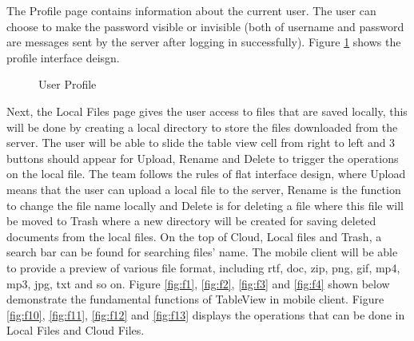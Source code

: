 \documentclass{article}
\begin{document}
The Profile page contains information about the current user. The user can choose to make the password visible or invisible (both of username and password are messages sent by the server after logging in successfully). Figure \ref{fig:example} shows the profile interface deisgn.

\begin{figure}[H]
    \centering
    \qquad
    \caption{User Profile}%
    \label{fig:example}%
\end{figure}

Next, the Local Files page gives the user access to files that are saved locally, this will be done by creating a local directory to store the files downloaded from the server. The user will be able to slide the table view cell from right to left and 3 buttons should appear for Upload, Rename and Delete to trigger the operations on the local file. The team follows the rules of flat interface design, where Upload means that the user can upload a local file to the server, Rename is the function to change the file name locally and Delete is for deleting a file where this file will be moved to Trash where a new directory will be created for saving deleted documents from the local files. On the top of Cloud, Local files and Trash, a search bar can be found for searching files' name. The mobile client will be able to provide a preview of various file format, including rtf, doc, zip, png, gif, mp4, mp3, jpg, txt and so on. Figure \ref{fig:f1}, \ref{fig:f2}, \ref{fig:f3} and \ref{fig:f4} shown below demonstrate the fundamental functions of TableView in mobile client. Figure \ref{fig:f10}, \ref{fig:f11}, \ref{fig:f12} and \ref{fig:f13} displays the operations that can be done in Local Files and Cloud Files.
\end{document}
